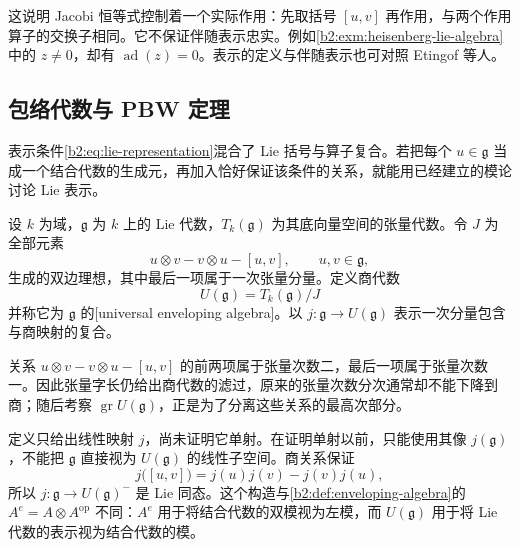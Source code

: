 这说明 Jacobi 恒等式控制着一个实际作用：先取括号 \([u,v]\) 再作用，与两个作用算子的交换子相同。它不保证伴随表示忠实。例如\cref{b2:exm:heisenberg-lie-algebra}中的 \(z\ne0\)，却有 \(\operatorname{ad}(z)=0\)。表示的定义与伴随表示也可对照 Etingof 等人\cite[Definition 2.9.7; Example 2.9.8, p. 24]{EtingofEtAl2011RepresentationTheory}。

\subsection{包络代数与 PBW 定理}
\label{b2:subsec:2004:02}

表示条件\eqref{b2:eq:lie-representation}混合了 Lie 括号与算子复合。若把每个 \(u\in\mathfrak g\) 当成一个结合代数的生成元，再加入恰好保证该条件的关系，就能用已经建立的模论讨论 Lie 表示。

\begin{definition}\label{b2:def:universal-enveloping-algebra}
	设 \(k\) 为域，\(\mathfrak g\) 为 \(k\) 上的 Lie 代数，\(T_k(\mathfrak g)\) 为其底向量空间的张量代数。令 \(J\) 为全部元素
	\[
		u\otimes v-v\otimes u-[u,v],\qquad u,v\in\mathfrak g,
	\]
	生成的双边理想，其中最后一项属于一次张量分量。定义商代数
	\[
		U(\mathfrak g)=T_k(\mathfrak g)/J
	\]
	并称它为 \(\mathfrak g\) 的[universal enveloping algebra]。以 \(j:\mathfrak g\to U(\mathfrak g)\) 表示一次分量包含与商映射的复合。
\end{definition}

关系 \(u\otimes v-v\otimes u-[u,v]\) 的前两项属于张量次数二，最后一项属于张量次数一。因此张量字长仍给出商代数的滤过，原来的张量次数分次通常却不能下降到商；随后考察 \(\operatorname{gr}U(\mathfrak g)\)，正是为了分离这些关系的最高次部分。

\ProseParagraphBreak
定义只给出线性映射 \(j\)，尚未证明它单射。在证明单射以前，只能使用其像 \(j(\mathfrak g)\)，不能把 \(\mathfrak g\) 直接视为 \(U(\mathfrak g)\) 的线性子空间。商关系保证
\begin{equation}\label{b2:eq:enveloping-canonical-lie-map}
	j\bigl([u,v]\bigr)=j(u)j(v)-j(v)j(u),
\end{equation}
所以 \(j:\mathfrak g\to U(\mathfrak g)^-\) 是 Lie 同态。这个构造与\cref{b2:def:enveloping-algebra}的 \(A^e=A\otimes A^{\mathrm{op}}\) 不同：\(A^e\) 用于将结合代数的双模视为左模，而 \(U(\mathfrak g)\) 用于将 Lie 代数的表示视为结合代数的模。


